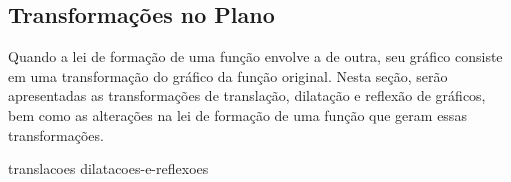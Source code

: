 \subsection{Transformações no Plano}

Quando a lei de formação de uma função envolve a de outra, seu gráfico consiste em uma transformação do gráfico da função original.
Nesta seção, serão apresentadas as transformações de translação, dilatação e reflexão de gráficos, bem como as alterações na lei de formação de uma função que geram essas transformações.

{translacoes}
{dilatacoes-e-reflexoes}
